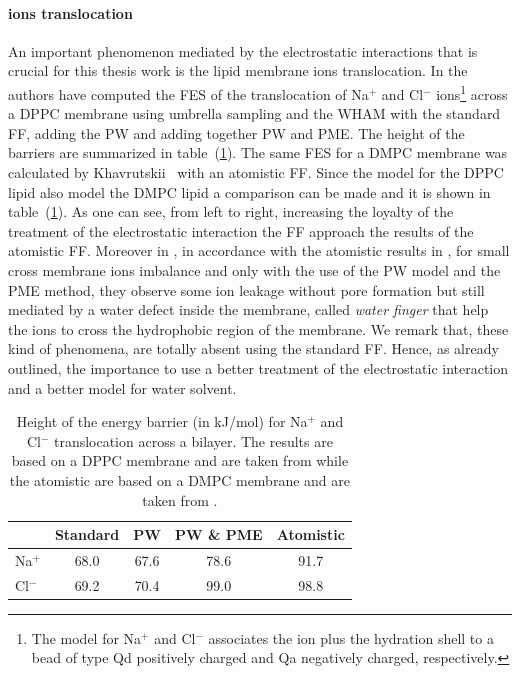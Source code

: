 \paragraph{\textbf{ions translocation}} An important phenomenon mediated by the electrostatic interactions that is crucial for this thesis work is the lipid membrane ions translocation. In \cite{PW} the authors have computed the \ac{FES} of the translocation of Na$^+$ and Cl$^-$ ions\footnote{The \martini model for Na$^+$ and Cl$^-$ associates the ion plus the hydration shell to a bead of type Qd positively charged and Qa negatively charged, respectively.} across a \acs{DPPC} membrane using umbrella sampling and the \ac{WHAM} with the standard \martini \ac{FF}, adding the \ac{PW} and adding together \ac{PW} and \ac{PME}. The height of the barriers are summarized in table~(\ref{tab:ionTranslocation}). The same \ac{FES} for a \acs{DMPC} membrane was calculated by Khavrutskii \etal\, \cite{atomisticTranslocation} with an atomistic \ac{FF}. Since the \martini model for the \acs{DPPC} lipid also model the \acs{DMPC} lipid a comparison can be made and it is shown in table~(\ref{tab:ionTranslocation}). As one can see, from left to right, increasing the loyalty of the treatment of the electrostatic interaction the \martini \ac{FF} approach the results of the atomistic \ac{FF}. Moreover in \cite{PW}, in accordance with the atomistic results in \cite{atomisticTranslocation}, for small cross membrane ions imbalance and only with the use of the \ac{PW} model and the \ac{PME} method, they observe some ion leakage without pore formation but still mediated by a water defect inside the membrane, called \textit{water finger} that help the ions to cross the hydrophobic region of the membrane. We remark that, these kind of phenomena, are totally absent using the standard \martini \ac{FF}. Hence, as already outlined, the importance to use a better treatment of the electrostatic interaction and a better model for water solvent.
\begin{table}[h!t]
	\centering
	\begin{tabular}{lcccc}
		\toprule
		\,		& Standard & \acs{PW} & \acs{PW} \& \acs{PME} & Atomistic	\\ \toprule
		Na$^+$	& 68.0	   & 67.6	  & 78.6					& 91.7 		\\ \midrule
		Cl$^-$	& 69.2	   & 70.4	  & 99.0					& 98.8		\\ \bottomrule
	\end{tabular}
	\caption{Height of the energy barrier (in kJ/mol) for Na$^+$ and Cl$^-$ translocation across a bilayer. The \martini results are based on a \acs{DPPC} membrane and are taken from \cite{PW} while the atomistic are based on a \acs{DMPC} membrane and are taken from \cite{atomisticTranslocation}.}
	\label{tab:ionTranslocation}
\end{table}

